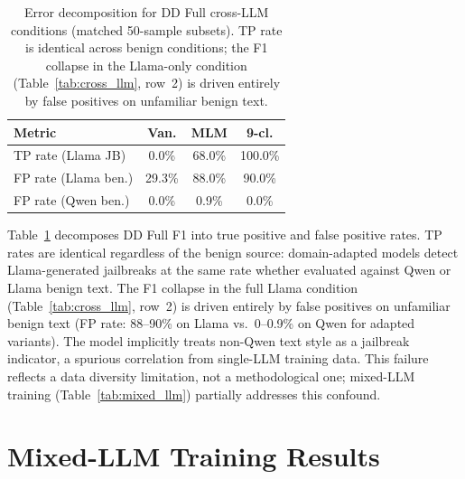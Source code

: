 \begin{table}[ht]
\centering
\footnotesize
\caption{Error decomposition for DD Full cross-LLM conditions (matched 50-sample subsets). TP rate is identical across benign conditions; the F1 collapse in the Llama-only condition (Table~\ref{tab:cross_llm}, row~2) is driven entirely by false positives on unfamiliar benign text.}
\label{tab:cross_llm_error}
\begin{tabular}{@{}lccc@{}}
\toprule
\textbf{Metric} & Van. & MLM & 9-cl. \\
\midrule
TP rate (Llama JB) & 0.0\% & 68.0\% & 100.0\% \\
FP rate (Llama ben.) & 29.3\% & 88.0\% & 90.0\% \\
FP rate (Qwen ben.) & 0.0\% & 0.9\% & 0.0\% \\
\bottomrule
\end{tabular}
\end{table}

Table~\ref{tab:cross_llm_error} decomposes DD Full F1 into true positive and false positive rates. TP rates are identical regardless of the benign source: domain-adapted models detect Llama-generated jailbreaks at the same rate whether evaluated against Qwen or Llama benign text. The F1 collapse in the full Llama condition (Table~\ref{tab:cross_llm}, row~2) is driven entirely by false positives on unfamiliar benign text (FP rate: 88--90\% on Llama vs.\ 0--0.9\% on Qwen for adapted variants). The model implicitly treats non-Qwen text style as a jailbreak indicator, a spurious correlation from single-LLM training data. This failure reflects a data diversity limitation, not a methodological one; mixed-LLM training (Table~\ref{tab:mixed_llm}) partially addresses this confound.

\section{Mixed-LLM Training Results}
\label{app:mixed_llm}

\begin{table}[ht]
\centering
\footnotesize
\caption{Mixed-LLM training (250 Qwen + 250 Llama conversations, 3-seed mean$\pm$std where available). ToxicChat evaluated on balanced set (408 conversations).}
\label{tab:mixed_llm}
\end{table}

